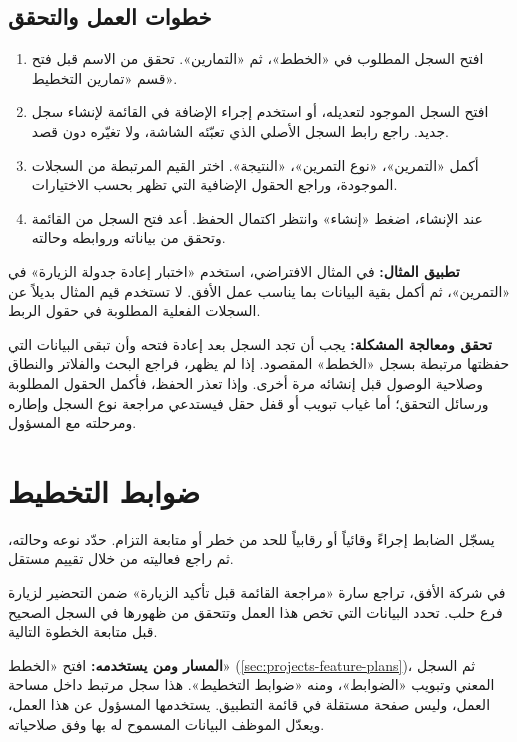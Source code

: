 \subsection{خطوات العمل والتحقق}
\begin{enumerate}
\item افتح السجل المطلوب في «الخطط»، ثم «التمارين». تحقق من الاسم قبل فتح قسم «تمارين التخطيط».
\item افتح السجل الموجود لتعديله، أو استخدم إجراء الإضافة في القائمة لإنشاء سجل جديد. راجع رابط السجل الأصلي الذي تعبّئه الشاشة، ولا تغيّره دون قصد.
\item أكمل «التمرين»، «نوع التمرين»، «النتيجة». اختر القيم المرتبطة من السجلات الموجودة، وراجع الحقول الإضافية التي تظهر بحسب الاختيارات.
\item عند الإنشاء، اضغط «إنشاء» وانتظر اكتمال الحفظ. أعد فتح السجل من القائمة وتحقق من بياناته وروابطه وحالته.
\end{enumerate}

\textbf{تطبيق المثال:} في المثال الافتراضي، استخدم «اختبار إعادة جدولة الزيارة» في «التمرين»، ثم أكمل بقية البيانات بما يناسب عمل الأفق. لا تستخدم قيم المثال بديلاً عن السجلات الفعلية المطلوبة في حقول الربط.

\textbf{تحقق ومعالجة المشكلة:} يجب أن تجد السجل بعد إعادة فتحه وأن تبقى البيانات التي حفظتها مرتبطة بسجل «الخطط» المقصود. إذا لم يظهر، فراجع البحث والفلاتر والنطاق وصلاحية الوصول قبل إنشائه مرة أخرى. وإذا تعذر الحفظ، فأكمل الحقول المطلوبة ورسائل التحقق؛ أما غياب تبويب أو قفل حقل فيستدعي مراجعة نوع السجل وإطاره ومرحلته مع المسؤول.

\clearpage
\section{ضوابط التخطيط}
\label{sec:projects-feature-planning-controls}

يسجّل الضابط إجراءً وقائياً أو رقابياً للحد من خطر أو متابعة التزام. حدّد نوعه وحالته، ثم راجع فعاليته من خلال تقييم مستقل.

\begin{rcnote}
في شركة الأفق، تراجع سارة «مراجعة القائمة قبل تأكيد الزيارة» ضمن التحضير لزيارة فرع حلب. تحدد البيانات التي تخص هذا العمل وتتحقق من ظهورها في السجل الصحيح قبل متابعة الخطوة التالية.
\end{rcnote}

\textbf{المسار ومن يستخدمه:} افتح «الخطط» (\ref{sec:projects-feature-plans})، ثم السجل المعني وتبويب «الضوابط»، ومنه «ضوابط التخطيط». هذا سجل مرتبط داخل مساحة العمل، وليس صفحة مستقلة في قائمة التطبيق. يستخدمها المسؤول عن هذا العمل، ويعدّل الموظف البيانات المسموح له بها وفق صلاحياته.

